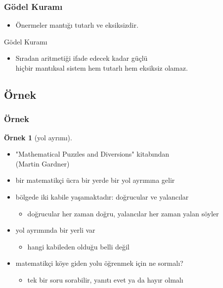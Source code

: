 \documentclass[dvipsnames]{beamer}
\theoremstyle{definition}
\theoremstyle{example}
\newtheorem{ornek}[theorem]{Örnek}
\theoremstyle{plain}
\begin{document}
\begin{frame}
  \frametitle{Gödel Kuramı}

  \begin{itemize}
    \item Önermeler mantığı tutarlı ve eksiksizdir.
  \end{itemize}

  \pause
  \begin{block}{Gödel Kuramı}
    \begin{itemize}
      \item Sıradan aritmetiği ifade edecek kadar güçlü\\
        hiçbir mantıksal sistem hem tutarlı hem eksiksiz olamaz.
    \end{itemize}
  \end{block}
\end{frame}

\subsection*{Örnek}

\begin{frame}
  \frametitle{Örnek}

  \begin{ornek}[yol ayrımı]
    \begin{itemize}
      \item "Mathematical Puzzles and Diversions" kitabından\\
        (Martin Gardner)

      \pause
      \medskip
      \item bir matematikçi ücra bir yerde bir yol ayrımına gelir
      \item bölgede iki kabile yaşamaktadır: doğrucular ve yalancılar
      \begin{itemize}
        \item doğrucular her zaman doğru, yalancılar her zaman yalan söyler
      \end{itemize}

      \item yol ayrımında bir yerli var
      \begin{itemize}
        \item hangi kabileden olduğu belli değil
      \end{itemize}

      \pause
      \item matematikçi köye giden yolu öğrenmek için ne sormalı?
      \begin{itemize}
        \item tek bir soru sorabilir, yanıtı evet ya da hayır olmalı
      \end{itemize}
    \end{itemize}
  \end{ornek}
\end{frame}
\end{document}
